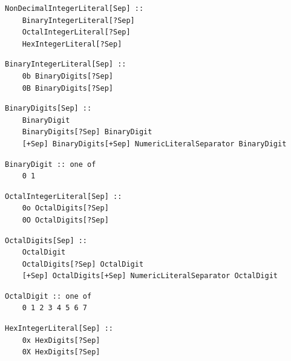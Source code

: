 \noindent\textbf{\texttt{}}\par
\begin{lstlisting}
NonDecimalIntegerLiteral[Sep] ::
    BinaryIntegerLiteral[?Sep]
    OctalIntegerLiteral[?Sep]
    HexIntegerLiteral[?Sep]
\end{lstlisting}

\noindent\textbf{\texttt{}}\par
\begin{lstlisting}
BinaryIntegerLiteral[Sep] ::
    0b BinaryDigits[?Sep]
    0B BinaryDigits[?Sep]
\end{lstlisting}

\noindent\textbf{\texttt{}}\par
\begin{lstlisting}
BinaryDigits[Sep] ::
    BinaryDigit
    BinaryDigits[?Sep] BinaryDigit
    [+Sep] BinaryDigits[+Sep] NumericLiteralSeparator BinaryDigit
\end{lstlisting}

\noindent\textbf{\texttt{}}\par
\begin{lstlisting}
BinaryDigit :: one of
    0 1
\end{lstlisting}

\noindent\textbf{\texttt{}}\par
\begin{lstlisting}
OctalIntegerLiteral[Sep] ::
    0o OctalDigits[?Sep]
    0O OctalDigits[?Sep]
\end{lstlisting}

\noindent\textbf{\texttt{}}\par
\begin{lstlisting}
OctalDigits[Sep] ::
    OctalDigit
    OctalDigits[?Sep] OctalDigit
    [+Sep] OctalDigits[+Sep] NumericLiteralSeparator OctalDigit
\end{lstlisting}

\noindent\textbf{\texttt{}}\par
\begin{lstlisting}
OctalDigit :: one of
    0 1 2 3 4 5 6 7
\end{lstlisting}

\noindent\textbf{\texttt{}}\par
\begin{lstlisting}
HexIntegerLiteral[Sep] ::
    0x HexDigits[?Sep]
    0X HexDigits[?Sep]
\end{lstlisting}

